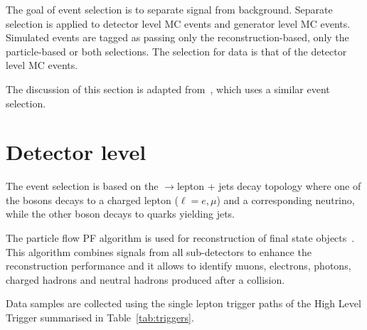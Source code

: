 The goal of event selection is to separate signal from background. Separate selection is applied to detector level MC events and generator level MC events. Simulated events are tagged as passing only the reconstruction-based, only the particle-based or both selections. The selection for data is that of the detector level MC events.

The discussion of this section is adapted from~\cite{CMS-AN-2017-159}, which uses a similar event selection.

\section{Detector level}
\label{sec:detector_level}

The event selection is based on the \ttbar$\to$lepton + jets decay topology where one of the \PW bosons decays to a charged lepton ($\ell=e, \mu$) and a corresponding neutrino, while the other \PW boson decays to quarks yielding jets.

The particle flow PF algorithm is used for reconstruction of final state objects~\cite{Sirunyan:2017ulk}. This algorithm combines signals from all sub-detectors to enhance the reconstruction performance and it allows to identify muons, electrons, photons, charged hadrons and neutral hadrons produced after a \Pp\Pp collision.

Data samples are collected using the single lepton trigger paths of the High Level Trigger summarised in Table~\ref{tab:triggers}.

